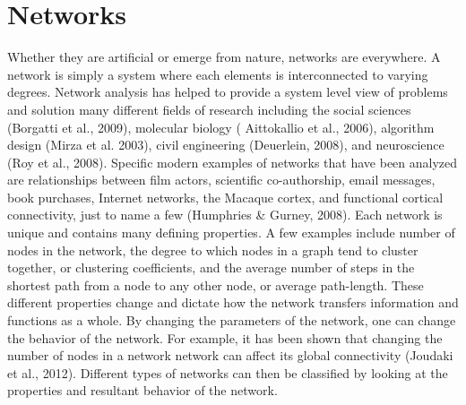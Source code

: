 \documentclass[12pt,letterpaper]{report}
\begin{document}
\section{Networks}
        Whether they are artificial or emerge from nature, networks are everywhere. A network is simply a system where each elements is interconnected to varying degrees. Network analysis has helped to provide a system level view of problems and solution many different fields of research including the social sciences (Borgatti et al., 2009), molecular biology ( Aittokallio et al., 2006), algorithm design (Mirza et al. 2003), civil engineering (Deuerlein, 2008), and neuroscience (Roy et al., 2008). Specific modern examples of networks that have been analyzed are relationships between film actors, scientific co-authorship, email messages, book purchases, Internet networks, the Macaque cortex, and functional cortical connectivity, just to name a few (Humphries & Gurney, 2008).
        Each network is unique and contains many defining properties. A few examples include number of nodes in the network, the degree to which nodes in a graph tend to cluster together, or  clustering coefficients, and the average number of steps in the shortest path from a node to any other node, or average path-length. These different properties change and dictate how the network transfers information and functions as a whole. By changing the parameters of the network, one can change the behavior of the network. For example, it has been shown that changing the number of nodes in a network network can affect its global connectivity (Joudaki et al., 2012). Different types of networks can then be classified by looking at the properties and resultant behavior of the network.
\end{document}
